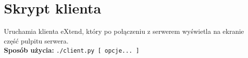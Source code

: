 


\subtitle{Dokumentacja użytkownika}
\maketitle

\tableofcontents
\vfill
\pagebreak

\section{Skrypt klienta}

  Uruchamia klienta eXtend, który po połączeniu z serwerem wyświetla na ekranie część pulpitu serwera. \\

  \textbf{Sposób użycia:}
  \texttt{./client.py [ opcje... ]}

